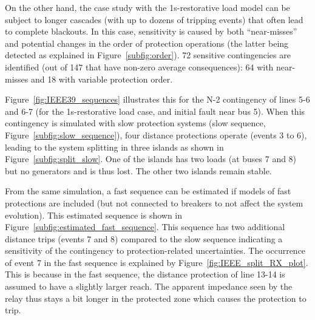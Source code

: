 On the other hand, the case study with the 1s-restorative load model can be subject to longer cascades (with up to dozens of tripping events) that often lead to complete blackouts. In this case, sensitivity is caused by both ``near-misses'' and potential changes in the order of protection operations (the latter being detected as explained in Figure~\ref{subfig:order}). 72 sensitive contingencies are identified (out of 147 that have non-zero average consequences): 64 with near-misses and 18 with variable protection order.

Figure~\ref{fig:IEEE39_sequences} illustrates this for the N-2 contingency of lines 5-6 and 6-7 (for the 1s-restorative load case, and initial fault near bus 5). When this contingency is simulated with slow protection systems (slow sequence, Figure~\ref{subfig:slow_sequence}), four distance protections operate (events 3 to 6), leading to the system splitting in three islands as shown in Figure~\ref{subfig:split_slow}. One of the islands has two loads (at buses 7 and 8) but no generators and is thus lost. The other two islands remain stable.

From the same simulation, a fast sequence can be estimated if models of fast protections are included (but not connected to breakers to not affect the system evolution). This estimated sequence is shown in Figure~\ref{subfig:estimated_fast_sequence}. This sequence has two additional distance trips (events 7 and 8) compared to the slow sequence indicating a sensitivity of the contingency to protection-related uncertainties. The occurrence of event 7 in the fast sequence is explained by Figure~\ref{fig:IEEE_split_RX_plot}. This is because in the fast sequence, the distance protection of line 13-14 is assumed to have a slightly larger reach. The apparent impedance seen by the relay thus stays a bit longer in the protected zone which causes the protection to trip.

